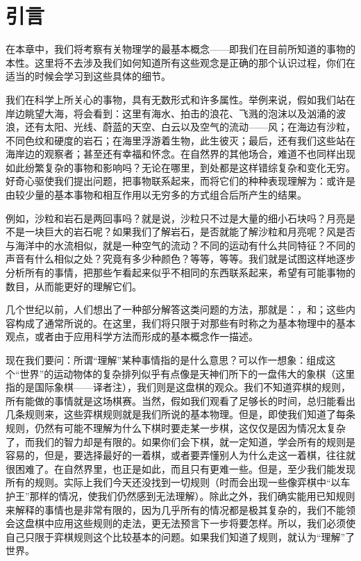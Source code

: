 \documentclass[12pt,oneside]{book}
\begin{document}
\section{引言}
在本章中，我们将考察有关物理学的最基本概念——即我们在目前所知道的事物的本性。这里将不去涉及我们如何知道所有这些观念是正确的那个认识过程，你们在适当的时候会学习到这些具体的细节。

我们在科学上所关心的事物，具有无数形式和许多属性。举例来说，假如我们站在岸边眺望大海，将会看到：这里有海水、拍击的浪花、飞溅的泡沫以及汹涌的波浪，还有太阳、光线、蔚蓝的天空、白云以及空气的流动——风；在海边有沙粒，不同色纹和硬度的岩石；在海里浮游着生物，此生彼灭；最后，还有我们这些站在海岸边的观察者；甚至还有幸福和怀念。在自然界的其他场合，难道不也同样出现如此纷繁复杂的事物和影响吗？无论在哪里，到处都是这样错综复杂和变化无穷。好奇心驱使我们提出问题，把事物联系起来，而将它们的种种表现理解为：或许是由较少量的基本事物和相互作用以无穷多的方式组合后所产生的结果。

例如，沙粒和岩石是两回事吗？就是说，沙粒只不过是大量的细小石块吗？月亮是不是一块巨大的岩石呢？如果我们了解岩石，是否就能了解沙粒和月亮呢？风是否与海洋中的水流相似，就是一种空气的流动？不同的运动有什么共同特征？不同的声音有什么相似之处？究竟有多少种颜色？等等，等等。我们就是试图这样地逐步分析所有的事情，把那些乍看起来似乎不相同的东西联系起来，希望有可能事物的数目，从而能更好的理解它们。

几个世纪以前，人们想出了一种部分解答这类问题的方法，那就是：，和；这些内容构成了通常所说的。在这里，我们将只限于对那些有时称之为基本物理中的基本观点，或者由于应用科学方法而形成的基本概念作一描述。

现在我们要问：所谓“理解”某种事情指的是什么意思？可以作一想象：组成这个“世界”的运动物体的复杂排列似乎有点像是天神们所下的一盘伟大的象棋（这里指的是国际象棋——译者注），我们则是这盘棋的观众。我们不知道弈棋的规则，所有能做的事情就是这场棋赛。当然，假如我们观看了足够长的时间，总归能看出几条规则来，这些弈棋规则就是我们所说的基本物理。但是，即使我们知道了每条规则，仍然有可能不理解为什么下棋时要走某一步棋，这仅仅是因为情况太复杂了，而我们的智力却是有限的。如果你们会下棋，就一定知道，学会所有的规则是容易的，但是，要选择最好的一着棋，或者要弄懂别人为什么走这一着棋，往往就很困难了。在自然界里，也正是如此，而且只有更难一些。但是，至少我们能发现所有的规则。实际上我们今天还没找到一切规则（时而会出现一些像弈棋中“以车护王”那样的情况，使我们仍然感到无法理解）。除此之外，我们确实能用已知规则来解释的事情也是非常有限的，因为几乎所有的情况都是极其复杂的，我们不能领会这盘棋中应用这些规则的走法，更无法预言下一步将要怎样。所以，我们必须使自己只限于弈棋规则这个比较基本的问题。如果我们知道了规则，就认为“理解”了世界。
\end{document}
